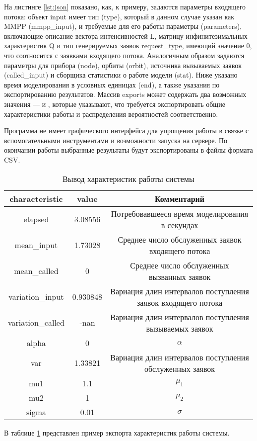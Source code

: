 На листинге \ref{lst:json} показано, как, к примеру, задаются параметры входящего потока: 
объект input имеет тип (type), который в данном случае указан как MMPP (mmpp\_input), и требуемые для его работы параметры (parameters), включающие описание вектора интенсивностей L, матрицу инфинитезимальных характеристик Q и тип генерируемых заявок request\_type, имеющий значение 0, что соотносится с заявками входящего потока. Аналогичным образом задаются параметры для прибора (node), орбиты (orbit), источника вызываемых заявок (called\_input) и сборщика статистики о работе модели (stat). Ниже указано время моделирования в условных единицах (end), а также указания по экспортированию результатов. Массив exports может содержать два возможных значения ---  и , которые указывают, что требуется экспортировать общие характеристики работы и распределения вероятностей соответственно.

Программа не имеет графического интерфейса для упрощения работы в связке с вспомогательными инструментами и возможности запуска на сервере. По окончании работы выбранные результаты будут экспортированы в файлы формата CSV.

\begin{table}[H] 
	\centering
	\caption{Вывод характеристик работы системы}
	\label{output_ex}
	\begin{tabular}{| c | c | c |}
		\hline
		characteristic & value & Комментарий  \\ 
		\hline
		elapsed & 3.08556 & \specialcell{Потребовавшееся время моделирования\\в секундах}\\
		\hline
		mean\_input & 1.73028 & \specialcell{Среднее число обслуженных заявок\\входящего потока}\\
		\hline
		mean\_called & 0 & \specialcell{Среднее число обслуженных\\вызванных заявок}  \\ 
		\hline
		variation\_input & 0.930848 & \specialcell{Вариация длин интервалов поступления\\заявок входящего потока}  \\ 
		\hline
		variation\_called & -nan & \specialcell{Вариация длин интервалов поступления\\вызываемых заявок}  \\ 
		\hline
		alpha & 0 & $\alpha$  \\ 
		\hline
		var & 1.33821 & \specialcell{Вариация длин интервалов поступления\\обслуженных заявок} \\ 
		\hline
		mu1 & 1.1 & $\mu_1$ \\ 
		\hline
		mu2 & 1 & $\mu_2$  \\ 
		\hline
		sigma & 0.01 & $\sigma$  \\ 
		\hline
	\end{tabular}
\end{table}
В таблице \ref{output_ex} представлен пример экспорта характеристик работы системы.
